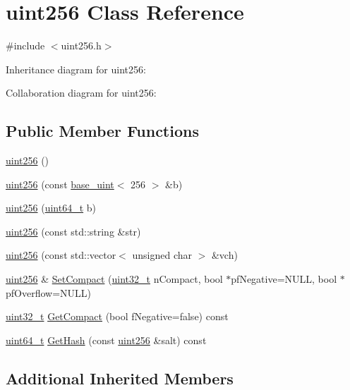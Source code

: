 \hypertarget{classuint256}{}\section{uint256 Class Reference}
\label{classuint256}


{\ttfamily \#include $<$uint256.\+h$>$}



Inheritance diagram for uint256\+:


Collaboration diagram for uint256\+:
\subsection*{Public Member Functions}
\begin{DoxyCompactItemize}
\item 
\hyperlink{classuint256_aca0c2c2c61e453717e72a4eaec71168f}{uint256} ()
\item 
\hyperlink{classuint256_af6d285b43ee909dd07448c0dba0c1606}{uint256} (const \hyperlink{classbase__uint}{base\+\_\+uint}$<$ 256 $>$ \&b)
\item 
\hyperlink{classuint256_a1d340146fe2db1dfe45bc6c721e7588b}{uint256} (\hyperlink{stdint_8h_aaa5d1cd013383c889537491c3cfd9aad}{uint64\+\_\+t} b)
\item 
\hyperlink{classuint256_a4078e4911984722778f19581865462b9}{uint256} (const std\+::string \&str)
\item 
\hyperlink{classuint256_a7cad0fc486ebc2ed02462d5a7d4e4f2d}{uint256} (const std\+::vector$<$ unsigned char $>$ \&vch)
\item 
\hyperlink{classuint256}{uint256} \& \hyperlink{classuint256_a54bc91c8535c43f881bba1fdb11ca7fa}{Set\+Compact} (\hyperlink{stdint_8h_a435d1572bf3f880d55459d9805097f62}{uint32\+\_\+t} n\+Compact, bool $\ast$pf\+Negative=N\+U\+L\+L, bool $\ast$pf\+Overflow=N\+U\+L\+L)
\item 
\hyperlink{stdint_8h_a435d1572bf3f880d55459d9805097f62}{uint32\+\_\+t} \hyperlink{classuint256_af30486eee47f077f91ed762d0db6ddca}{Get\+Compact} (bool f\+Negative=false) const 
\item 
\hyperlink{stdint_8h_aaa5d1cd013383c889537491c3cfd9aad}{uint64\+\_\+t} \hyperlink{classuint256_a2ed8bd4e54421a37430768374a7e91b3}{Get\+Hash} (const \hyperlink{classuint256}{uint256} \&salt) const 
\end{DoxyCompactItemize}
\subsection*{Additional Inherited Members}


